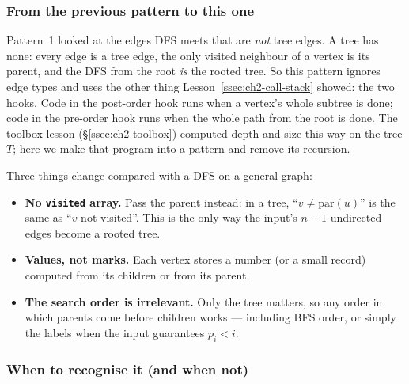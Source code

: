 \subsubsection*{From the previous pattern to this one}

Pattern~1 looked at the edges DFS meets that are \emph{not} tree edges. A tree has none: every edge is a tree edge, the only visited neighbour of a vertex is its parent, and the DFS from the root \emph{is} the rooted tree. So this pattern ignores edge types and uses the other thing Lesson~\ref{ssec:ch2-call-stack} showed: the two hooks. Code in the post-order hook runs when a vertex's whole subtree is done; code in the pre-order hook runs when the whole path from the root is done. The toolbox lesson (\S\ref{ssec:ch2-toolbox}) computed depth and size this way on the tree $T$; here we make that program into a pattern and remove its recursion.

Three things change compared with a DFS on a general graph:
\begin{itemize}[leftmargin=*]
    \item \textbf{No \texttt{visited} array.} Pass the parent instead: in a tree, ``$v \ne \mathrm{par}(u)$'' is the same as ``$v$ not visited''. This is the only way the input's $n - 1$ undirected edges become a rooted tree.
    \item \textbf{Values, not marks.} Each vertex stores a number (or a small record) computed from its children or from its parent.
    \item \textbf{The search order is irrelevant.} Only the tree matters, so any order in which parents come before children works --- including BFS order, or simply the labels when the input guarantees $p_i < i$.
\end{itemize}

\subsubsection*{When to recognise it (and when not)}

